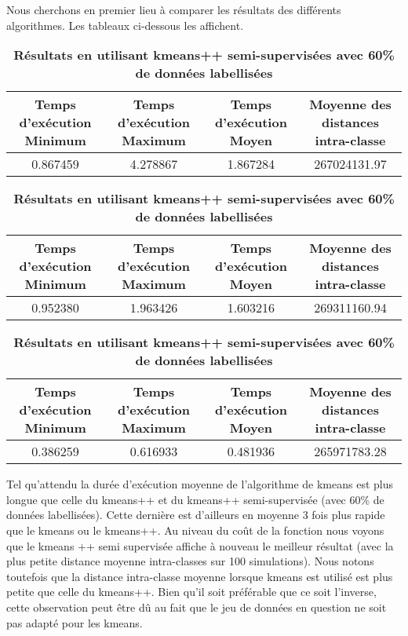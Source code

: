 \documentclass[ ]{article}
\begin{document}
\noindent
Nous cherchons en premier lieu à comparer les résultats des différents algorithmes. Les tableaux ci-dessous les affichent.

\begin{table}[ht]
\footnotesize
\centering

\vspace{10 mm}
\caption{\textbf{Résultats en utilisant kmeans}} 

\begin{tabular}{c|c|c|c}
\hline
\rowcolor{Gray}
Temps d'exécution Minimum & Temps d'exécution Maximum & Temps d'exécution Moyen & Moyenne des distances intra-classe \\
\hline
0.867459&4.278867& 1.867284& \cellcolor{LightCyan}267024131.97\\

\end{tabular}

\centering

\vspace{10 mm}
\caption{\textbf{Résultats en utilisant kmeans++}} 

\begin{tabular}[scale=0.50]{c|c|c|c}
\hline
\rowcolor{Gray}
Temps d'exécution Minimum & Temps d'exécution Maximum & Temps d'exécution Moyen & Moyenne des distances intra-classe \\
\hline
0.952380&1.963426& 1.603216& \cellcolor{LightCyan}269311160.94\\

\end{tabular}

\centering

\vspace{10 mm}
\caption{\textbf{Résultats en utilisant kmeans++ semi-supervisées avec 60\% de données labellisées}} 

\begin{tabular}{c|c|c|c}
\hline
\rowcolor{Gray}
Temps d'exécution Minimum & Temps d'exécution Maximum & Temps d'exécution Moyen & Moyenne des distances intra-classe \\
\hline
0.386259&0.616933& 0.481936& \cellcolor{LightCyan}265971783.28\\
\end{tabular}

\end{table}

\vspace{10 mm}


\noindent 
Tel qu'attendu la durée d'exécution moyenne de l'algorithme de kmeans est plus longue que celle du kmeans++ et du kmeans++ semi-supervisée (avec 60\% de données labellisées). Cette dernière est d'ailleurs en moyenne 3 fois plus rapide que le kmeans ou le kmeans++. Au niveau du coût de la fonction nous voyons que le kmeans ++ semi supervisée affiche à nouveau le meilleur résultat (avec la plus petite distance moyenne intra-classes sur 100 simulations). Nous notons toutefois que la distance intra-classe moyenne lorsque kmeans est utilisé est plus petite que celle du kmeans++.  Bien qu'il soit préférable que ce soit l'inverse, cette observation peut être dû au fait que le jeu de données en question ne soit pas adapté pour les kmeans. 
\end{document}
